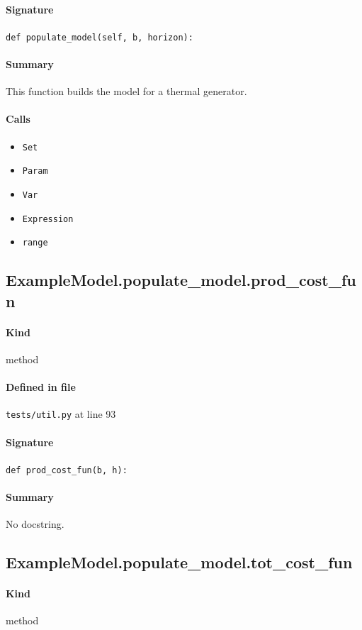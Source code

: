 \documentclass[11pt]{report}
\begin{document}
\paragraph{Signature} \texttt{def populate\_model(self, b, horizon):}
\paragraph{Summary} This function builds the model for a thermal generator.
\paragraph{Calls}
\begin{itemize}[leftmargin=*]
  \item \texttt{Set}
  \item \texttt{Param}
  \item \texttt{Var}
  \item \texttt{Expression}
  \item \texttt{range}
\end{itemize}
\subsection{ExampleModel.populate\_model.prod\_cost\_fun}
\label{def:tests-util.py:ExampleModel.populate_model.prod_cost_fun:L93}
\paragraph{Kind} method
\paragraph{Defined in file} \texttt{tests/util.py} at line 93
\paragraph{Signature} \texttt{def prod\_cost\_fun(b, h):}
\paragraph{Summary} No docstring.
\subsection{ExampleModel.populate\_model.tot\_cost\_fun}
\label{def:tests-util.py:ExampleModel.populate_model.tot_cost_fun:L99}
\paragraph{Kind} method
\end{document}
